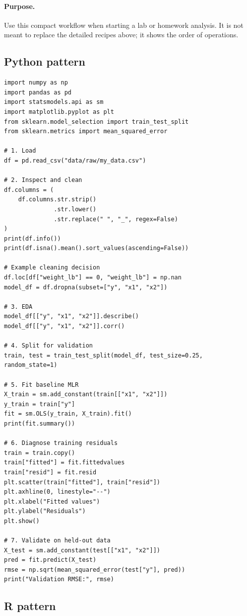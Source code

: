 \paragraph{Purpose.} Use this compact workflow when starting a lab or homework analysis.  It is not meant to replace the detailed recipes above; it shows the order of operations.

\subsection*{Python pattern}

\begin{verbatim}
import numpy as np
import pandas as pd
import statsmodels.api as sm
import matplotlib.pyplot as plt
from sklearn.model_selection import train_test_split
from sklearn.metrics import mean_squared_error

# 1. Load
df = pd.read_csv("data/raw/my_data.csv")

# 2. Inspect and clean
df.columns = (
    df.columns.str.strip()
              .str.lower()
              .str.replace(" ", "_", regex=False)
)
print(df.info())
print(df.isna().mean().sort_values(ascending=False))

# Example cleaning decision
df.loc[df["weight_lb"] == 0, "weight_lb"] = np.nan
model_df = df.dropna(subset=["y", "x1", "x2"])

# 3. EDA
model_df[["y", "x1", "x2"]].describe()
model_df[["y", "x1", "x2"]].corr()

# 4. Split for validation
train, test = train_test_split(model_df, test_size=0.25, random_state=1)

# 5. Fit baseline MLR
X_train = sm.add_constant(train[["x1", "x2"]])
y_train = train["y"]
fit = sm.OLS(y_train, X_train).fit()
print(fit.summary())

# 6. Diagnose training residuals
train = train.copy()
train["fitted"] = fit.fittedvalues
train["resid"] = fit.resid
plt.scatter(train["fitted"], train["resid"])
plt.axhline(0, linestyle="--")
plt.xlabel("Fitted values")
plt.ylabel("Residuals")
plt.show()

# 7. Validate on held-out data
X_test = sm.add_constant(test[["x1", "x2"]])
pred = fit.predict(X_test)
rmse = np.sqrt(mean_squared_error(test["y"], pred))
print("Validation RMSE:", rmse)
\end{verbatim}

\subsection*{R pattern}

